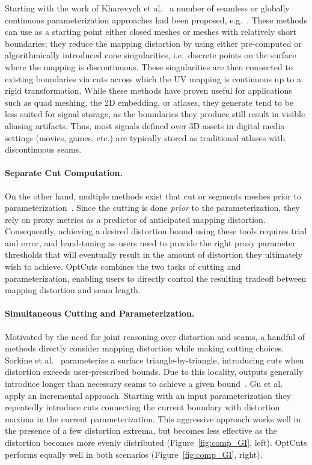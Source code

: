 Starting with the work of Kharevych et al.~ a number of seamless or globally continuous parameterization approaches had been proposed, e.g.\ \cite{Ray,Myles,Aigerman}. These methods can use as a starting point either closed meshes or meshes with relatively short boundaries; they reduce the mapping distortion by using either pre-computed or algorithmically introduced cone singularities, i.e.\ discrete points on the surface where the mapping is discontinuous. These singularities are then connected to existing boundaries via cuts across which the UV mapping is continuous up to a rigid transformation.  While these methods have proven useful for applications such as quad meshing, the 2D embedding, or atlases, they generate tend to be less suited for signal storage, as the boundaries they produce still result in visible aliasing artifacts. Thus, most signals defined over 3D assets in digital media settings (movies, games, etc.) are typically stored as traditional atlases with discontinuous seams.  

\paragraph{Separate Cut Computation.}
On the other hand, multiple methods exist that cut or segments meshes prior to parameterization~\cite{Sheffer2002Seamster,Julius2005D,Snyder2003Multi,Levy2002}.
Since the cutting is done \emph{prior} to the parameterization, they rely on proxy metrics as a predictor of anticipated mapping distortion. Consequently, achieving a desired distortion bound using these tools requires trial and error, and hand-tuning as users need to provide the right proxy parameter thresholds that will eventually result in the amount of distortion they ultimately wish to achieve. OptCuts combines the two tasks of cutting and parameterization, enabling users to directly control the resulting tradeoff between mapping distortion and seam length. 

\paragraph{Simultaneous Cutting and Parameterization.}
Motivated by the need for joint reasoning over distortion and seams, a handful of methods directly consider mapping distortion while making cutting choices. 
Sorkine et al.~ parameterize a surface triangle-by-triangle, introducing cuts when distortion exceeds user-prescribed bounds. Due to this locality, outputs generally introduce longer than necessary seams to achieve a given bound~\cite{Hormann2008,Poranne2017Autocuts}. 
Gu et al.~ apply an incremental approach. Starting with an input parameterization they repeatedly introduce cuts connecting the current boundary with distortion maxima in the current parameterization. This aggressive approach works well in the presence of a few distortion extrema, but becomes less effective as the distortion becomes more evenly distributed (Figure~\ref{fig:comp_GI}, left). OptCuts performs equally well in both scenarios (Figure~\ref{fig:comp_GI}, right).  

